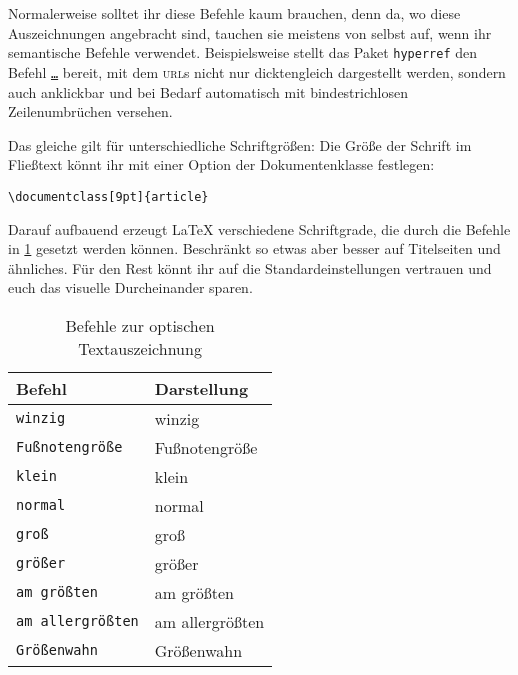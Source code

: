 Normalerweise solltet ihr diese Befehle kaum brauchen, denn da, wo diese Auszeichnungen angebracht sind, tauchen sie meistens von selbst auf, wenn ihr semantische Befehle verwendet.
Beispielsweise stellt das Paket \texttt{hyperref} den Befehl \texttt{\url{…}} bereit, mit dem \textsc{url}s nicht nur dicktengleich dargestellt werden, sondern auch anklickbar und bei Bedarf automatisch mit bindestrichlosen Zeilenumbrüchen versehen.

Das gleiche gilt für unterschiedliche Schriftgrößen: 
Die Größe der Schrift im Fließtext könnt ihr mit einer Option der Dokumentenklasse festlegen: 
\begin{verbatim}
\documentclass[9pt]{article}
\end{verbatim}
Darauf aufbauend erzeugt \LaTeX{} verschiedene Schriftgrade, die durch die Befehle in \cref{tbl:schriftgrade} gesetzt werden können.
Beschränkt so etwas aber besser auf Titelseiten und ähnliches.
Für den Rest könnt ihr auf die Standardeinstellungen vertrauen und euch das visuelle Durcheinander sparen.

\begin{table}[H]
	\center
	\begin{tabular}{ll}
		\toprule
		Befehl & Darstellung \\
		\midrule
		\texttt{{\tiny winzig}} & {\tiny winzig} \\
		\texttt{{\footnotesize Fußnotengröße}} & {\footnotesize Fußnotengröße} \\
		\texttt{{\small klein}} & {\small klein} \\
		\texttt{{\normalsize normal}} & {\normalsize normal} \\
		\texttt{{\large groß}} & {\large groß} \\
		\texttt{{\Large größer}} & {\Large größer} \\
		\texttt{{\LARGE am größten}} & {\LARGE am größten} \\
		\texttt{{\huge am allergrößten}} & {\huge am allergrößten} \\
		\texttt{{\Huge Größenwahn}} & {\Huge Größenwahn} \\
		\bottomrule
	\end{tabular}
	\caption{Befehle zur optischen Textauszeichnung}
	\label{tbl:schriftgrade}
\end{table}


